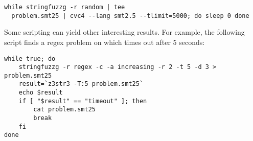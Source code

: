 {\begin{center}
\begin{varwidth}{\linewidth}
{\scriptsize\begin{verbatim}while stringfuzzg -r random | tee
  problem.smt25 | cvc4 --lang smt2.5 --tlimit=5000; do sleep 0 done
\end{verbatim}}
\end{varwidth}
\end{center}

Some \unix{} scripting can yield other interesting results. For
example, the following script finds a regex problem on which \us{}
times out after 5 seconds:

\begin{center}
\begin{varwidth}{\linewidth}
        {\scriptsize\begin{verbatim}while true; do
    stringfuzzg -r regex -c -a increasing -r 2 -t 5 -d 3 > problem.smt25
    result=`z3str3 -T:5 problem.smt25`
    echo $result
    if [ "$result" == "timeout" ]; then
        cat problem.smt25
        break
    fi
done\end{verbatim}}
\end{varwidth}
\end{center}


}
